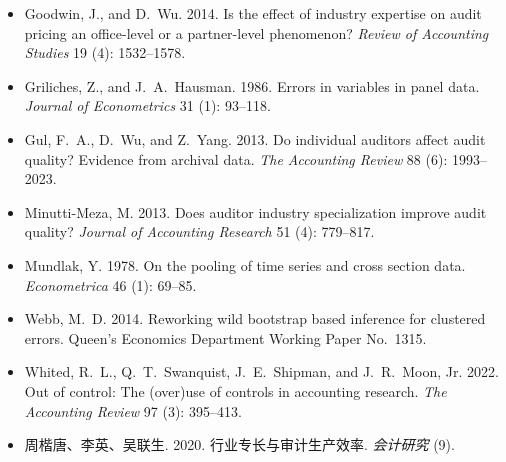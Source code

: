\documentclass[11pt]{article}
\begin{document}
\begin{itemize}
\item Goodwin, J., and D.~Wu. 2014. Is the effect of industry expertise on audit pricing an office-level or a partner-level phenomenon? \textit{Review of Accounting Studies} 19 (4): 1532--1578.
\item Griliches, Z., and J.~A.~Hausman. 1986. Errors in variables in panel data. \textit{Journal of Econometrics} 31 (1): 93--118.
\item Gul, F.~A., D.~Wu, and Z.~Yang. 2013. Do individual auditors affect audit quality? Evidence from archival data. \textit{The Accounting Review} 88 (6): 1993--2023.
\item Minutti-Meza, M. 2013. Does auditor industry specialization improve audit quality? \textit{Journal of Accounting Research} 51 (4): 779--817.
\item Mundlak, Y. 1978. On the pooling of time series and cross section data. \textit{Econometrica} 46 (1): 69--85.
\item Webb, M.~D. 2014. Reworking wild bootstrap based inference for clustered errors. Queen's Economics Department Working Paper No.~1315.
\item Whited, R.~L., Q.~T.~Swanquist, J.~E.~Shipman, and J.~R.~Moon, Jr. 2022. Out of control: The (over)use of controls in accounting research. \textit{The Accounting Review} 97 (3): 395--413.
\item 周楷唐、李英、吴联生. 2020. 行业专长与审计生产效率. \textit{会计研究} (9).
\end{itemize}
\end{document}
